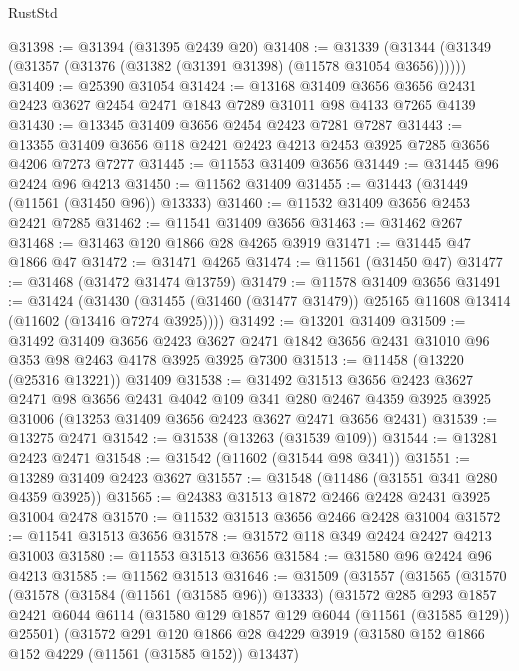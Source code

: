 \begin{lexlean}{RustStd}
\begin{coremodule}
@31398 := @31394 (@31395 @2439 @20)
@31408 := @31339 (@31344 (@31349 (@31357 (@31376 (@31382 (@31391 @31398) (@11578 @31054 @3656))))))
@31409 := @25390 @31054
@31424 := @13168
    @31409
    @3656
    @3656
    @2431
    @2423
    @3627
    @2454
    @2471
    @1843
    @7289
    @31011
    @98
    @4133
    @7265
    @4139
@31430 := @13345 @31409 @3656 @2454 @2423 @7281 @7287
@31443 := @13355 @31409 @3656 @118 @2421 @2423 @4213 @2453 @3925 @7285 @3656 @4206 @7273 @7277
@31445 := @11553 @31409 @3656
@31449 := @31445 @96 @2424 @96 @4213
@31450 := @11562 @31409
@31455 := @31443 (@31449 (@11561 (@31450 @96)) @13333)
@31460 := @11532 @31409 @3656 @2453 @2421 @7285
@31462 := @11541 @31409 @3656
@31463 := @31462 @267
@31468 := @31463 @120 @1866 @28 @4265 @3919
@31471 := @31445 @47 @1866 @47
@31472 := @31471 @4265
@31474 := @11561 (@31450 @47)
@31477 := @31468 (@31472 @31474 @13759)
@31479 := @11578 @31409 @3656
@31491 := @31424
    (@31430 (@31455 (@31460 (@31477 @31479)) @25165 @11608 @13414 (@11602 (@13416 @7274 @3925))))
@31492 := @13201 @31409
@31509 := @31492
    @31409
    @3656
    @2423
    @3627
    @2471
    @1842
    @3656
    @2431
    @31010
    @96
    @353
    @98
    @2463
    @4178
    @3925
    @3925
    @7300
@31513 := @11458 (@13220 (@25316 @13221)) @31409
@31538 := @31492
    @31513
    @3656
    @2423
    @3627
    @2471
    @98
    @3656
    @2431
    @4042
    @109
    @341
    @280
    @2467
    @4359
    @3925
    @3925
    @31006
    (@13253 @31409 @3656 @2423 @3627 @2471 @3656 @2431)
@31539 := @13275 @2471
@31542 := @31538 (@13263 (@31539 @109))
@31544 := @13281 @2423 @2471
@31548 := @31542 (@11602 (@31544 @98 @341))
@31551 := @13289 @31409 @2423 @3627
@31557 := @31548 (@11486 (@31551 @341 @280 @4359 @3925))
@31565 := @24383 @31513 @1872 @2466 @2428 @2431 @3925 @31004 @2478
@31570 := @11532 @31513 @3656 @2466 @2428 @31004
@31572 := @11541 @31513 @3656
@31578 := @31572 @118 @349 @2424 @2427 @4213 @31003
@31580 := @11553 @31513 @3656
@31584 := @31580 @96 @2424 @96 @4213
@31585 := @11562 @31513
@31646 := @31509
    (@31557
      (@31565
        (@31570
          (@31578
            (@31584 (@11561 (@31585 @96)) @13333)
            (@31572
              @285
              @293
              @1857
              @2421
              @6044
              @6114
              (@31580 @129 @1857 @129 @6044 (@11561 (@31585 @129)) @25501)
              (@31572
                @291
                @120
                @1866
                @28
                @4229
                @3919
                (@31580 @152 @1866 @152 @4229 (@11561 (@31585 @152)) @13437)

\end{coremodule}
\end{lexlean}
